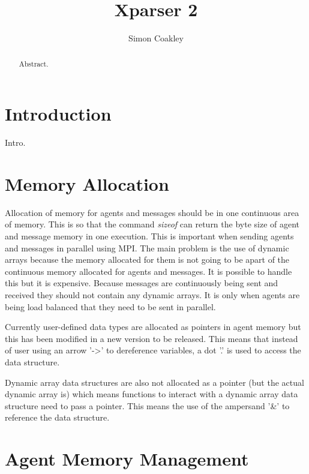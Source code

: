 \documentclass[a4paper,12pt]{article}
\begin{document}
\title{Xparser 2}

\author{Simon Coakley}
\maketitle

\begin{abstract}

Abstract.

\end{abstract}

\section{Introduction}

Intro.

\section{Memory Allocation}

Allocation of memory for agents and messages should be in one continuous area of memory. This is so that the command \textit{sizeof} can return the byte size of agent and message memory in one execution. This is important when sending agents and messages in parallel using MPI. The main problem is the use of dynamic arrays because the memory allocated for them is not going to be apart of the continuous memory allocated for agents and messages. It is possible to handle this but it is expensive. Because messages are continuously being sent and received they should not contain any dynamic arrays. It is only when agents are being load balanced that they need to be sent in parallel.

Currently user-defined data types are allocated as pointers in agent memory but this has been modified in a new version to be released. This means that instead of user using an arrow '-\textgreater' to dereference variables, a dot '.' is used to access the data structure.

Dynamic array data structures are also not allocated as a pointer (but the actual dynamic array is) which means functions to interact with a dynamic array data structure need to pass a pointer. This means the use of the ampersand '\&' to reference the data structure.

\section{Agent Memory Management}
\end{document}
